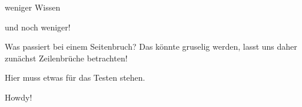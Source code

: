weniger Wissen


und noch weniger!










\newpage



Was passiert bei einem Seitenbruch? Das könnte gruselig werden, lasst uns daher zunächst Zeilenbrüche betrachten!


















Hier muss etwas für das Testen stehen.










Howdy!